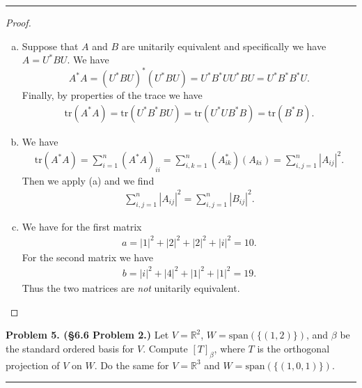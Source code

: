 \documentclass[leqno]{article}
\theoremstyle{nonumberplain}
\newtheorem{proof}{Proof}
\newcommand{\tr}{\mathrm{tr}}
\newcommand{\R}{\mathbb{R}}
\begin{document}
\noindent\rule[0.5ex]{\linewidth}{1pt}

\begin{proof}~
\begin{enumerate}[(a)]
\item Suppose that $A$ and $B$ are unitarily equivalent and specifically we have $A=U^*BU$.  We have 
\[A^*A=(U^*BU)^*(U^*BU)=U^*B^*UU^*BU=U^*B^*B^*U.
\]
Finally, by properties of the trace we have
\begin{align*}
\tr(A^*A)=\tr(U^*B^*BU)=\tr(U^*UB^*B)=\tr(B^*B).
\end{align*}

\item We have
\begin{align*}
\tr(A^*A)=\sum_{i=1}^n (A^*A)_{ii}=\sum_{i,k=1}^n (A^*_{ik})(A_{ki})=\sum_{i,j=1}^n |A_{ij}|^2.
\end{align*}
Then we apply (a) and we find
\begin{align*}
\sum_{i,j=1}^n |A_{ij}|^2 = \sum_{i,j=1}^n |B_{ij}|^2.
\end{align*}


\item We have for the first matrix
\begin{align*}
a=|1|^2+|2|^2+|2|^2+|i|^2=10.
\end{align*}
For the second matrix we have
\begin{align*}
b=|i|^2+|4|^2+|1|^2+|1|^2=19.
\end{align*}
Thus the two matrices are \emph{not} unitarily equivalent.

\end{enumerate}
\end{proof}

\pagebreak





\noindent\textbf{Problem 5. (\S 6.6 Problem 2.)} Let $V=\R^2$, $W=\mathrm{span}(\{(1,2)\})$, and $\beta$ be the standard ordered basis for $V$. Compute $[T]_\beta$, where $T$ is the orthogonal projection of $V$ on $W$. Do the same for $V=\R^3$ and $W=\mathrm{span}(\{(1,0,1)\})$.

\noindent\rule[0.5ex]{\linewidth}{1pt}
\end{document}
